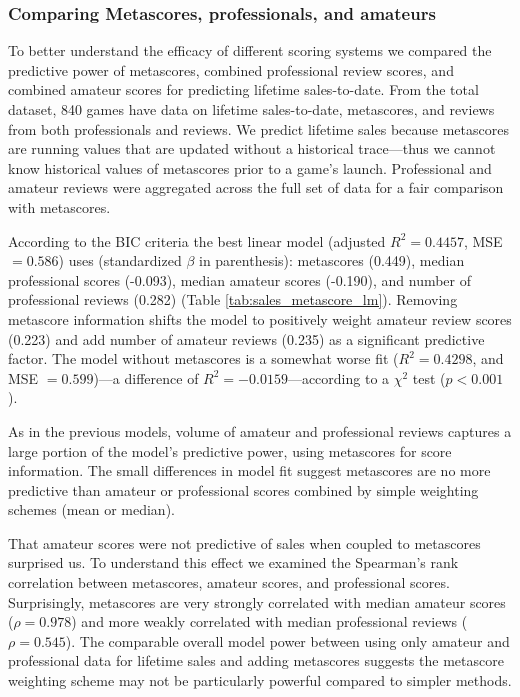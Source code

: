 \documentclass{sig-alternate}
\begin{document}
\subsubsection{Comparing Metascores, professionals, and amateurs}
To better understand the efficacy of different scoring systems we compared the predictive power of metascores, combined professional review scores, and combined amateur scores for predicting lifetime sales-to-date. From the total dataset, 840 games have data on lifetime sales-to-date, metascores, and reviews from both professionals and reviews. We predict lifetime sales because metascores are running values that are updated without a historical trace---thus we cannot know historical values of metascores prior to a game's launch. Professional and amateur reviews were aggregated across the full set of data for a fair comparison with metascores.

According to the BIC criteria the best linear model (adjusted $R^2 = 0.4457$, MSE $= 0.586$) uses (standardized $\beta$ in parenthesis): metascores (0.449), median professional scores (-0.093), median amateur scores (-0.190), and number of professional reviews (0.282) (Table \ref{tab:sales_metascore_lm}). Removing metascore information shifts the model to positively weight amateur review scores (0.223) and add number of amateur reviews (0.235) as a significant predictive factor. The model without metascores is a somewhat worse fit ($R^2 = 0.4298$, and MSE $= 0.599$)---a difference of $R^2 = -0.0159$---according to a $\chi^2$ test ($p < 0.001$).

As in the previous models, volume of amateur and professional reviews captures a large portion of the model's predictive power, using metascores for score information. The small differences in model fit suggest metascores are no more predictive than amateur or professional scores combined by simple weighting schemes (mean or median). 

That amateur scores were not predictive of sales when coupled to metascores surprised us. To understand this effect we examined the Spearman's rank correlation between metascores, amateur scores, and professional scores. Surprisingly, metascores are very strongly correlated with median amateur scores ($\rho = 0.978$) and more weakly correlated with median professional reviews ($\rho = 0.545$). The comparable overall model power between using only amateur and professional data for lifetime sales and adding metascores suggests the metascore weighting scheme may not be particularly powerful compared to simpler methods.
\end{document}
